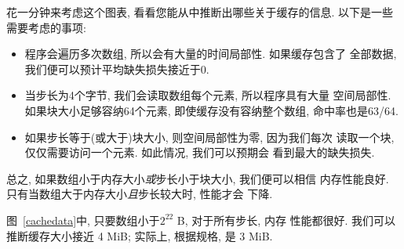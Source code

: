 \documentclass[12pt]{book}
\begin{document}
{%
花一分钟来考虑这个图表, 看看您能从中推断出哪些关于缓存的信息. 
以下是一些需要考虑的事项:

\begin{itemize}

\item 程序会遍历多次数组, 所以会有大量的时间局部性. 如果缓存包含了
全部数据, 我们便可以预计平均缺失损失接近于0.

  \item 当步长为4个字节, 我们会读取数组每个元素, 所以程序具有大量
  空间局部性. 如果块大小足够容纳64个元素, 即使缓存没有容纳整个数组, 
  命中率也是63/64.

 \item 如果步长等于(或大于)块大小, 则空间局部性为零, 因为我们每次
 读取一个块, 仅仅需要访问一个元素. 如此情况, 我们可以预期会
 看到最大的缺失损失.

\end{itemize}

总之, 如果数组小于内存大小{\em 或}步长小于块大小, 我们便可以相信
内存性能良好. 只有当数组大于内存大小{\em 且}步长较大时, 性能才会
下降. 

图~\ref{cachedata}中, 只要数组小于$2^{22}$ B, 对于所有步长, 内存
性能都很好. 我们可以推断缓存大小接近 4 MiB; 实际上, 根据规格, 
是 3 MiB.

}
\end{document}
